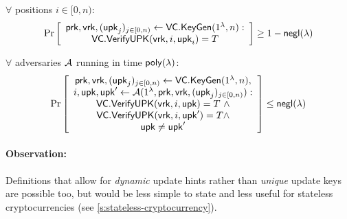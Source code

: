 \begin{definition}
    $\forall$ positions $i\in[0,n)$:
    \begin{align*}
    \Pr \left[ \begin{array}{c}
    \mathsf{prk},\mathsf{vrk},(\mathsf{upk}_j)_{j\in[0,n)} \leftarrow \mathsf{VC}.\mathsf{KeyGen}(1^\lambda, n):\\
    \mathsf{VC}.\mathsf{VerifyUPK}(\mathsf{vrk}, i, \mathsf{upk}_i) = T
    \end{array} \right] \ge 1 - \mathsf{negl}(\lambda)
    \end{align*}
\end{definition}
\fi

\begin{definition}
    \label{def:vc:update-key-uniquness}
    $\forall$ adversaries $\mathcal{A}$ running in time $\mathsf{poly}(\lambda)$:
    \begin{align*}
    \Pr \left[ \begin{array}{c}
    \mathsf{prk},\mathsf{vrk},(\mathsf{upk}_j)_{j\in[0,n)} \leftarrow \mathsf{VC}.\mathsf{KeyGen}(1^\lambda, n),\\
    i, \mathsf{upk},\mathsf{upk}' \leftarrow \mathcal{A}(1^\lambda, \mathsf{prk},\mathsf{vrk},(\mathsf{upk}_j)_{j\in[0,n)}):\\
    \mathsf{VC}.\mathsf{VerifyUPK}(\mathsf{vrk}, i, \mathsf{upk}) = T\ \wedge \\
    \mathsf{VC}.\mathsf{VerifyUPK}(\mathsf{vrk}, i, \mathsf{upk}') = T \wedge \\
    \mathsf{upk} \ne \mathsf{upk}'
    \end{array} \right] \le \mathsf{negl}(\lambda)
    \end{align*}
\end{definition}

\paragraph{Observation:}
Definitions that allow for \textit{dynamic} update hints rather than \textit{unique} update keys are possible too, but would be less simple to state and less useful for stateless cryptocurrencies (see \cref{s:stateless-cryptocurrency}).

